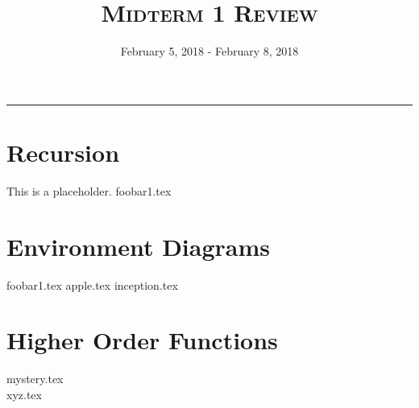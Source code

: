 \documentclass{exam}
\title{\textsc{Midterm 1 Review}}
\date{February 5, 2018 - February 8, 2018}
\begin{document}
\maketitle
\rule{\textwidth}{0.15em}
\fontsize{12}{15}\selectfont


\section{Recursion}
\begin{questions}
This is a placeholder.
{foobar1.tex}
\end{questions}

\newpage
\section{Environment Diagrams}
\begin{questions}
{foobar1.tex}
\newpage
{apple.tex}
\newpage
{inception.tex}

\newpage
\section{Higher Order Functions}
{mystery.tex}
\\[10\baselineskip]
{xyz.tex}
\end{questions}
\end{document}
